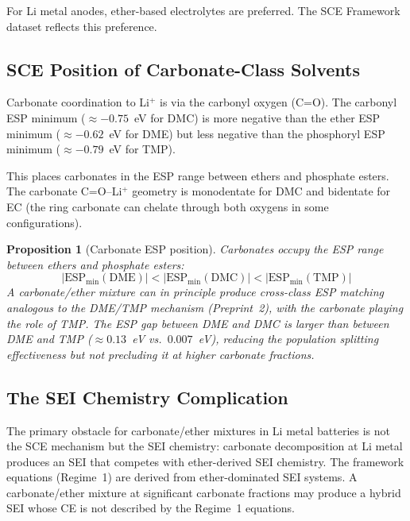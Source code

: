 \documentclass[11pt]{article}
\theoremstyle{plain}
\newtheorem{proposition}[theorem]{Proposition}
\theoremstyle{definition}
\theoremstyle{remark}
\begin{document}
For Li metal anodes, ether-based electrolytes are preferred.
The SCE Framework dataset reflects this preference.

\subsection{SCE Position of Carbonate-Class Solvents}

Carbonate coordination to Li$^+$ is via the carbonyl oxygen
(C=O).  The carbonyl ESP minimum ($\approx -0.75$~eV for DMC)
is more negative than the ether ESP minimum ($\approx -0.62$~eV
for DME) but less negative than the phosphoryl ESP minimum
($\approx -0.79$~eV for TMP).

This places carbonates in the ESP range between ethers and
phosphate esters.  The carbonate C=O--Li$^+$ geometry is
monodentate for DMC and bidentate for EC (the ring carbonate
can chelate through both oxygens in some configurations).

\begin{proposition}[Carbonate ESP position]
Carbonates occupy the ESP range between ethers and phosphate
esters:
\begin{equation}
  |\mathrm{ESP}_{\min}(\mathrm{DME})| <
  |\mathrm{ESP}_{\min}(\mathrm{DMC})| <
  |\mathrm{ESP}_{\min}(\mathrm{TMP})|
\end{equation}
A carbonate/ether mixture can in principle produce cross-class
ESP matching analogous to the DME/TMP mechanism (Preprint~2),
with the carbonate playing the role of TMP.  The ESP gap
between DME and DMC is larger than between DME and TMP
($\approx 0.13$~eV vs.\ $0.007$~eV), reducing the population
splitting effectiveness but not precluding it at higher
carbonate fractions.
\end{proposition}

\subsection{The SEI Chemistry Complication}

The primary obstacle for carbonate/ether mixtures in Li metal
batteries is not the SCE mechanism but the SEI chemistry:
carbonate decomposition at Li metal produces an SEI that
competes with ether-derived SEI chemistry.  The framework
equations (Regime~1) are derived from ether-dominated SEI
systems.  A carbonate/ether mixture at significant carbonate
fractions may produce a hybrid SEI whose CE is not described
by the Regime~1 equations.
\end{document}
